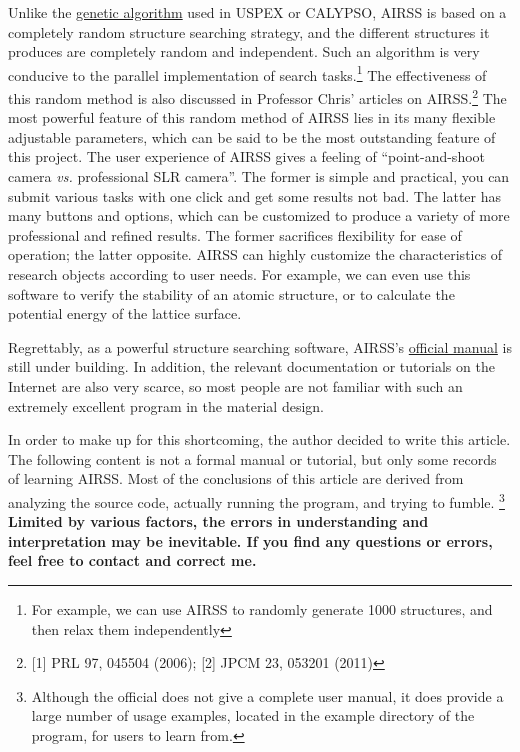 \documentclass[a4paper, 10pt]{article}
\begin{document}
Unlike the \href{https://en.wikipedia.org/wiki/Genetic_algorithm}{genetic algorithm} used in USPEX or CALYPSO, AIRSS is based on a completely random structure searching strategy, and the different structures it produces are completely random and independent. Such an algorithm is very conducive to the parallel implementation of search tasks.\footnote{For example, we can use AIRSS to randomly generate 1000 structures, and then relax them independently} The effectiveness of this random method is also discussed in Professor Chris' articles on AIRSS.\footnote{ [1] PRL 97, 045504 (2006); [2] JPCM 23, 053201 (2011)} The most powerful feature of this random method of AIRSS lies in its many flexible adjustable parameters, which can be said to be the most outstanding feature of this project. The user experience of AIRSS gives a feeling of ``point-and-shoot camera \emph{vs.} professional SLR camera''. The former is simple and practical, you can submit various tasks with one click and get some results not bad. The latter has many buttons and options, which can be customized to produce a variety of more professional and refined results. The former sacrifices flexibility for ease of operation; the latter opposite. AIRSS can highly customize the characteristics of research objects according to user needs. For example, we can even use this software to verify the stability of an atomic structure, or to calculate the potential energy of the lattice surface.

Regrettably, as a powerful structure searching software, AIRSS's \href{https://airss-docs.github.io/technical-reference/buildcell-manual/}{official manual} is still under building. In addition, the relevant documentation or tutorials on the Internet are also very scarce, so most people are not familiar with such an extremely excellent program in the material design.


In order to make up for this shortcoming, the author decided to write this article. The following content is not a formal manual or tutorial, but only some records of learning AIRSS. Most of the conclusions of this article are derived from analyzing the source code, actually running the program, and trying to fumble. \footnote{Although the official does not give a complete user manual, it does provide a large number of usage examples, located in the example directory of the program, for users to learn from.} \textbf{Limited by various factors, the errors in understanding and interpretation may be inevitable. If you find any questions or errors, feel free to contact and correct me.}
\end{document}
